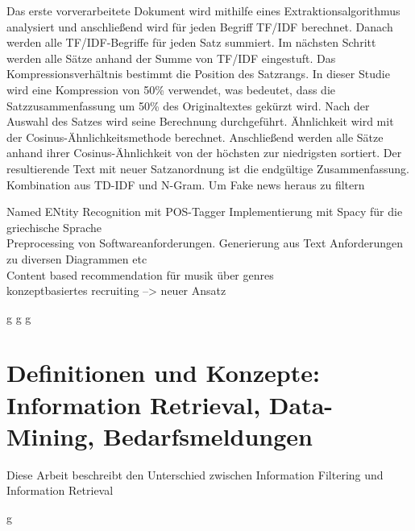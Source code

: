 Das erste vorverarbeitete Dokument wird mithilfe eines Extraktionsalgorithmus
analysiert und anschließend wird für jeden Begriff TF/IDF berechnet.
Danach werden alle TF/IDF-Begriffe für jeden Satz summiert.
Im nächsten Schritt werden alle Sätze anhand der Summe von TF/IDF eingestuft.
Das Kompressionsverhältnis bestimmt die Position des Satzrangs. In dieser Studie wird eine Kompression von 50\% verwendet, was bedeutet,
dass die Satzzusammenfassung um 50\% des Originaltextes gekürzt wird. Nach der Auswahl des Satzes wird seine Berechnung durchgeführt.
Ähnlichkeit wird mit der Cosinus-Ähnlichkeitsmethode berechnet. 
Anschließend werden alle Sätze anhand ihrer Cosinus-Ähnlichkeit von der höchsten zur niedrigsten sortiert.
Der resultierende Text mit
neuer Satzanordnung ist die endgültige Zusammenfassung.\cite{darmawan2015hybrid}\\


Kombination aus TD-IDF und N-Gram. Um Fake news heraus zu filtern\cite{suhasini2021hybrid}

Named ENtity Recognition mit POS-Tagger Implementierung mit Spacy für die griechische Sprache\cite{partalidou2019design}\\

Preprocessing von Softwareanforderungen. Generierung aus Text Anforderungen zu diversen Diagrammen etc \cite{kroha2000preprocessing}\\

Content based recommendation für musik über genres \cite{reddy2019content}\\

konzeptbasiertes recruiting --> neuer Ansatz

\newpage
g
\newpage
g
\newpage
g
\newpage

\section{Definitionen und Konzepte: Information Retrieval, Data-Mining, Bedarfsmeldungen}
\label{sec:definitionen-konzepte}

Diese Arbeit beschreibt den Unterschied zwischen Information Filtering und Information Retrieval\cite{belkin1992information}

\newpage
g
\newpage





